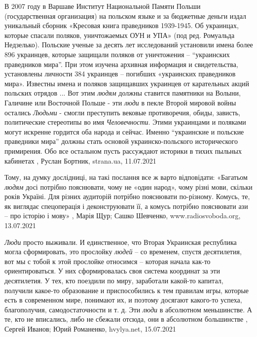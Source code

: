 В 2007 году в Варшаве Институт Национальной Памяти Польши (государственная
организация) на польском языке и за бюджетные деньги издал уникальный сборник
«Кресовая книга праведников 1939-1945. Об украинцах, которые спасали поляков,
уничтожаемых ОУН и УПА» (под ред. Ромуальда Недзелько). Польские ученые за
десять лет исследований установили имена более 896 украинцев, которые защищали
поляков от уничтожения – \enquote{украинских праведников мира}. При этом
изучена архивная информация и свидетельства, установлены личности 384 украинцев
– погибших «украинских праведников мира». Известны имена и поляков защищавших
украинцев от карательных акций польских отрядов ...  Вот этим \emph{людям}
должны ставится памятники на Волыни, Галичине или Восточной Польше - эти
\emph{люди} в пекле Второй мировой войны остались \emph{Людьми} - смогли
преступить вековые противоречия, обиды, зависть, политические стереотипы во имя
\emph{Человечности}. Этими украинцами и поляками могут искренне гордится оба
народа и сейчас.  Именно \enquote{украинские и польские праведники мира} должны
стать основой украинско-польского исторического примирения.  Обо все остальном
пусть рассуждают историки в тихих пыльных кабинетах
, Руслан Бортник, strana.ua, 11.07.2021

Тому, на думку дослідниці, на такі послання все ж варто відповідати: «Багатьом
\emph{людям} досі потрібно пояснювати, чому не «один народ», чому різні мови, скільки
років Україні. Для різних аудиторій потрібно пояснювати по-різному. Комусь, те,
як виглядає спецоперація і деконструювати її, а комусь потрібно пояснювати ази
– про історію і мову»
, 
Марія Щур; Сашко Шевченко, www.radiosvoboda.org, 13.07.2021

\emph{Люди} просто выживали. И единственное, что Вторая Украинская республика
могла сформировать, это прослойку \emph{людей} – со временем, спустя
десятилетия, вот мы с тобой к этой прослойке относимся – которая начала как-то
ориентироваться. У них сформировалась своя система координат за эти
десятилетия.  У тех, кто поездили по миру, заработали какой-то капитал,
получили какое-то образование и приспособились к тем правилам игры, которые
есть в современном мире, понимают их, и поэтому досягают какого-то успеха,
благополучия, самодостаточности и т. д. Эти \emph{люди} в абсолютном
меньшинстве. А те, кто не вписались, либо не сбежали отсюда, они в абсолютном
большинстве
, 
Сергей Иванов; Юрий Романенко, hvylya.net, 15.07.2021


